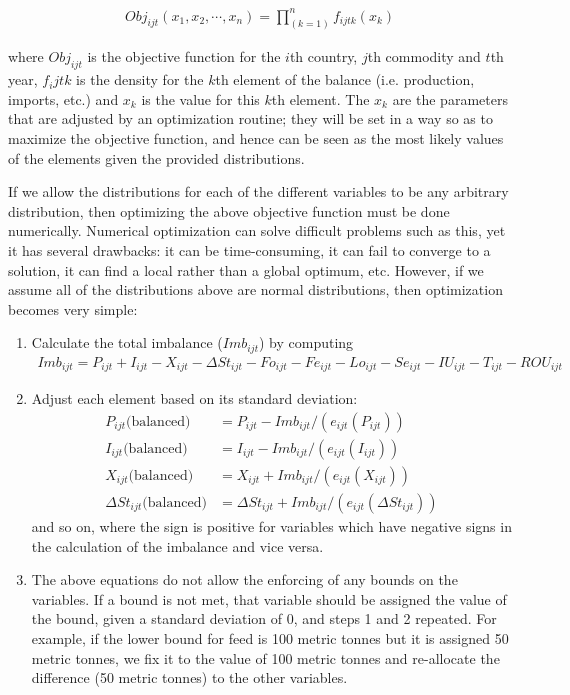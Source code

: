 \documentclass[nojss]{jss}
\begin{document}
\begin{align}
    Obj_{ijt}(x_1, x_2, \cdots, x_n) = \prod_{(k=1)}^n f_{ijtk}(x_k)
\end{align}
 
where $Obj_{ijt}$ is the objective function for the $i$th country, $j$th commodity and $t$th year, $f_ijtk$ is the density for the $k$th element of the balance (i.e. production, imports, etc.) and $x_k$ is the value for this $k$th element. The $x_k$ are the parameters that are adjusted by an optimization routine; they will be set in a way so as to maximize the objective function, and hence can be seen as the most likely values of the elements given the provided distributions.
 
If we allow the distributions for each of the different variables to be any arbitrary distribution, then optimizing the above objective function must be done numerically.  Numerical optimization can solve difficult problems such as this, yet it has several drawbacks: it can be time-consuming, it can fail to converge to a solution, it can find a local rather than a global optimum, etc.  However, if we assume all of the distributions above are normal distributions, then optimization becomes very simple:

\begin{enumerate}
\item Calculate the total imbalance ($Imb_{ijt}$) by computing
\begin{align}
    Imb_{ijt} = P_{ijt} + I_{ijt} - X_{ijt} - \Delta St_{ijt} - Fo_{ijt} - Fe_{ijt} - Lo_{ijt} - Se_{ijt} - IU_{ijt} - T_{ijt} - ROU_{ijt}
\end{align}
\item Adjust each element based on its standard deviation:
\begin{align*}
    P_{ijt} \mbox{(balanced)} &= P_{ijt}- Imb_{ijt}/(e_{ijt}(P_{ijt}))\\
    I_{ijt} \mbox{(balanced)} &= I_{ijt}- Imb_{ijt}/(e_{ijt}(I_{ijt}))\\
    X_{ijt} \mbox{(balanced)} &= X_{ijt} + Imb_{ijt}/(e_{ijt} (X_{ijt}))\\
    \Delta St_{ijt} \mbox{(balanced)} &= \Delta St_{ijt} + Imb_{ijt}/(e_{ijt}(\Delta St_{ijt}))
\end{align*}
and so on, where the sign is positive for variables which have negative signs in the calculation of the imbalance and vice versa.
\item The above equations do not allow the enforcing of any bounds on the variables.  If a bound is not met, that variable should be assigned the value of the bound, given a standard deviation of 0, and steps 1 and 2 repeated.  For example, if the lower bound for feed is 100 metric tonnes but it is assigned 50 metric tonnes, we fix it to the value of 100 metric tonnes and re-allocate the difference (50 metric tonnes) to the other variables.
\end{enumerate}
\end{document}
